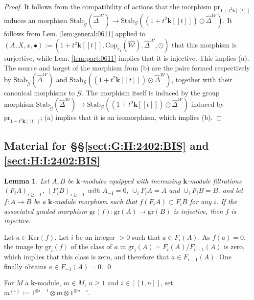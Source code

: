 \documentclass[10pt]{amsart}
\newtheorem{lem}[thm]{Lemma}
\numberwithin{equation}{subsection}
\begin{document}
\begin{proof}
It follows from the compatibility of actions that the morphism  $\mathrm{pr}_{1+t^2\mathbf k[[t]]}$ induces an 
morphism $\mathrm{Stab}_{\tilde{\mathcal G}}(\hat\Delta^{\mathcal W})\to
\mathrm{Stab}_{\mathcal G}((1+t^2\mathbf k[[t]])\odot \hat\Delta^{\mathcal W})$. 
 It follows from Lem. \ref{lem:general:0611}
applied to $(A,X,x,\bullet):=(1+t^2\mathbf k[[t]],\mathrm{Cop}_{e_1}(\hat{\mathcal W}),\hat\Delta^{\mathcal W},\odot)$ 
that this morphism is surjective, while Lem. \ref{lem:part:0611} implies that it is injective. This implies (a). 
The source and target of the morphism from (b) are the pairs formed 
respectively by $\mathrm{Stab}_{\tilde{\mathcal G}}(\hat\Delta^{\mathcal W})$ and 
$\mathrm{Stab}_{\mathcal G}((1+t^2\mathbf k[[t]])\odot \hat\Delta^{\mathcal W})$, 
together with their canonical 
morphisms to $\mathcal G$. The morphism itself is induced by the group 
morphism  $\mathrm{Stab}_{\tilde{\mathcal G}}(\hat\Delta^{\mathcal W})\to
\mathrm{Stab}_{\mathcal G}((1+t^2\mathbf k[[t]])\odot \hat\Delta^{\mathcal W})$ induced by 
$\mathrm{pr}_{1+t^2\mathbf k[[t]]}$; (a) implies that it is an 
isomorphism, which implies (b). 
\end{proof}

\subsection{Material for §§\ref{sect:G:H:2402:BIS} and \ref{sect:H:I:2402:BIS}}\label{sect:4:6:5786}

\begin{lem}\label{lem:filtration:BIS}
Let $A,B$ be $\mathbf k$-modules equipped with increasing $\mathbf k$-module filtrations $(F_iA)_{i\geq-1}$, $(F_iB)_{i\geq-1}$ with $A_{-1}=0$, 
$\cup_i F_iA=A$ and $\cup_i F_i B=B$, and let $f:A\to B$ be a $\mathbf k$-module morphism such that $f(F_iA)\subset F_iB$ 
for any $i$. If the associated graded morphism $\mathrm{gr}(f):\mathrm{gr}(A)\to\mathrm{gr}(B)$ is injective, then $f$ is injective.  
\end{lem}

\proof Let $a\in \mathrm{Ker}(f)$. Let $i$ be an integer $>0$ such that $a\in F_i(A)$. As 
$f(a)=0$, the image by $\mathrm{gr}_i(f)$ of the class of $a$ in $\mathrm{gr}_i(A)=F_i(A)/F_{i-1}(A)$
is zero, which implies that this class is zero, and therefore that $a\in F_{i-1}(A)$. One finally 
obtains $a\in F_{-1}(A)=0$. \hfill\qed\medskip 

For $M$ a $\mathbf k$-module, $m\in M$, $n\geq 1$ and $i\in[\!\![1,n]\!\!]$, set $m^{(i)}:=1^{\otimes i-1}\otimes m\otimes 1^{\otimes n-i}$.  
\end{document}
